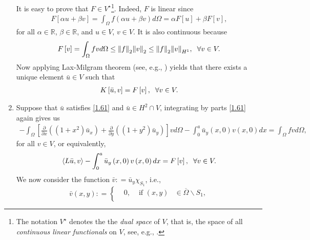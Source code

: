 \documentclass[11pt,a4paper]{article}
\numberwithin{equation}{section}
\numberwithin{equation}{section}
\begin{document}
\begin{enumerate}
It is easy to prove that $F \in V^\star$\footnote{The notation $V^\star$ denotes the the \textit{dual space} of $V$, that is, the space of all \textit{continuous linear functionals} on $V$, see, e.g., \cite[p. 3]{Haim}.}. Indeed, $F$ is linear since
\begin{align}
F\left[ {\alpha u + \beta v} \right] = \int_\Omega  {f\left( {\alpha u + \beta v} \right)d\Omega }  = \alpha F\left[ u \right] + \beta F\left[ v \right],
\end{align}
for all $\alpha \in \mathbb{R}$, $\beta \in \mathbb{R}$, and $u\in V$, $v\in V$. It is also continuous because
\begin{align}
F\left[ v \right] = \int_\Omega  {fvd\Omega }  \le {\left\| f \right\|_2}{\left\| v \right\|_2} \le {\left\| f \right\|_2}{\left\| v \right\|_{{H^1}}},\hspace{0.2cm}\forall v \in V.
\end{align}
Now applying Lax-Milgram theorem (see, e.g., \cite[Corollary 5.8, p. 140]{Haim}) yields that there exists a unique element $\bar u\in V$ such that 
\begin{align}
\label{1.61}
K\left[ {\bar u,v} \right] = F\left[ v \right], \hspace{0.2cm}\forall v \in V.
\end{align}
\item Suppose that $\bar u$ satisfies \eqref{1.61} and $\bar u \in {H^2} \cap V$, integrating by parts \eqref{1.61} again gives us
\begin{align}
 - \int_\Omega  {\left[ {\frac{\partial }{{\partial x}}\left( {\left( {1 + {x^2}} \right){{\bar u}_x}} \right) + \frac{\partial }{{\partial y}}\left( {\left( {1 + {y^2}} \right){{\bar u}_y}} \right)} \right]vd\Omega }  - \int_0^a {{{\bar u}_y}\left( {x,0} \right)v\left( {x,0} \right)dx}  = \int_\Omega  {fvd\Omega } ,
\end{align}
for all $v\in V$, or equivalently,
\begin{align}
\label{1.63}
\left\langle {L\bar u,v} \right\rangle  - \int_0^a {{{\bar u}_y}\left( {x,0} \right)v\left( {x,0} \right)dx}  = F\left[ v \right],\hspace{0.2cm} \forall v \in V.
\end{align}
We now consider the function $\bar v: = {{\bar u}_y}{\chi _{{S_1}}}$, i.e.,
\begin{equation}
\bar v\left( {x,y} \right): = \left\{ \begin{split}
& 0, &\mbox{ if } \left( {x,y} \right) &\in \overline \Omega \backslash {S_1},\\

\end{split}
\end{equation}
\end{enumerate}
\end{document}
